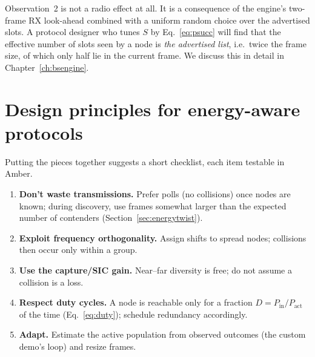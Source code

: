 \begin{reality}
Observation~2 is not a radio effect at all. It is a consequence of the engine's two-frame RX look-ahead combined with a uniform random choice over the advertised slots. A protocol designer who tunes $S$ by Eq.~\eqref{eq:psucc} will find that the effective number of slots seen by a node is \emph{the advertised list}, i.e.\ twice the frame size, of which only half lie in the current frame. We discuss this in detail in Chapter~\ref{ch:bsengine}.
\end{reality}

\section{Design principles for energy-aware protocols}
\label{sec:principles2}

Putting the pieces together suggests a short checklist, each item testable in Amber.
\begin{enumerate}
 \item \textbf{Don't waste transmissions.} Prefer polls (no collisions) once nodes are known; during discovery, use frames somewhat larger than the expected number of contenders (Section~\ref{sec:energytwist}).
 \item \textbf{Exploit frequency orthogonality.} Assign shifts to spread nodes; collisions then occur only within a group.
 \item \textbf{Use the capture/SIC gain.} Near--far diversity is free; do not assume a collision is a loss.
 \item \textbf{Respect duty cycles.} A node is reachable only for a fraction $D=P_{\mathrm{in}}/P_{\mathrm{act}}$ of the time (Eq.~\eqref{eq:duty}); schedule redundancy accordingly.
 \item \textbf{Adapt.} Estimate the active population from observed outcomes (the custom demo's loop) and resize frames.
\end{enumerate}

